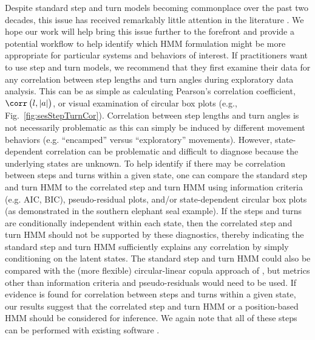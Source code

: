 \documentclass[12pt]{article}\usepackage[]{graphicx}\usepackage[]{xcolor}
\begin{document}
Despite standard step and turn models becoming commonplace over the past two decades, this issue has received remarkably little attention in the literature \citep[but see][]{hodel2022circular}. We hope our work will help bring this issue further to the forefront and provide a potential workflow to help identify which HMM formulation might be more appropriate for particular systems and behaviors of interest. If practitioners want to use step and turn models, we recommend that they first examine their data for any correlation between step lengths and turn angles during exploratory data analysis. This can be as simple as calculating Pearson's correlation coefficient, $\corr \left(l,\left|a \right| \right)$, or visual examination of circular box plots (e.g., Fig.\ \ref{fig:sesStepTurnCor}). Correlation between step lengths and turn angles is not necessarily problematic as this can simply be induced by different movement behaviors (e.g. ``encamped'' versus ``exploratory'' movements). However, state-dependent correlation can be problematic and difficult to diagnose because the underlying states are unknown. To help identify if there may be correlation between steps and turns within a given state, one can compare the standard step and turn HMM to the correlated step and turn HMM using information criteria (e.g. AIC, BIC), pseudo-residual plots, and/or state-dependent circular box plots (as demonstrated in the southern elephant seal example). If the steps and turns are conditionally independent within each state, then the correlated step and turn HMM should not be supported by these diagnostics, thereby indicating the standard step and turn HMM sufficiently explains any correlation by simply conditioning on the latent states. The standard step and turn HMM could also be compared with the (more flexible) circular-linear copula approach of \citet{hodel2022circular}, but metrics other than information criteria and pseudo-residuals would need to be used. If evidence is found for correlation between steps and turns within a given state, our results suggest that the correlated step and turn HMM or a position-based HMM should be considered for inference. We again note that all of these steps can be performed with existing software \citep[e.g.][]{McClintockMichelot2018,hodel2022circular}.
\end{document}
